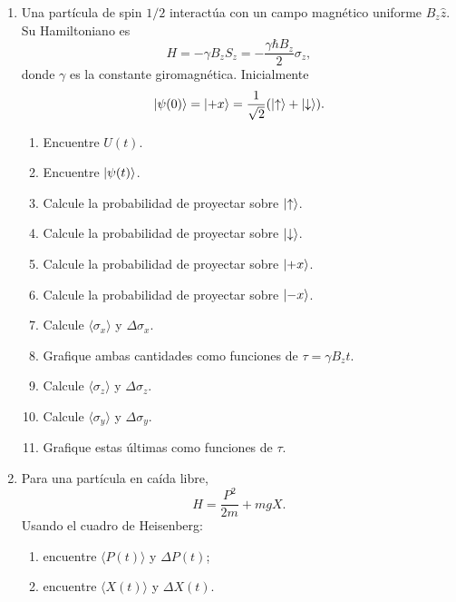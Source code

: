 \documentclass[11pt,a4paper]{article}
\numberwithin{equation}{section}
\begin{document}
\begin{enumerate}[label=\arabic*.-]
\item Una partícula de spin $1/2$ interactúa con un campo magnético uniforme $B_z\hat z$. Su Hamiltoniano es
\begin{equation}
H=-\gamma B_zS_z=-\frac{\gamma\hbar B_z}{2}\sigma_z,
\end{equation}
donde $\gamma$ es la constante giromagnética. Inicialmente
\begin{equation}
\ket{\psi(0)}=\ket{+x}=\frac{1}{\sqrt2}(\ket\uparrow+\ket\downarrow).
\end{equation}
\begin{enumerate}[label=\alph*)]
\item Encuentre $U(t)$.
\item Encuentre $\ket{\psi(t)}$.
\item Calcule la probabilidad de proyectar sobre $\ket\uparrow$.
\item Calcule la probabilidad de proyectar sobre $\ket\downarrow$.
\item Calcule la probabilidad de proyectar sobre $\ket{+x}$.
\item Calcule la probabilidad de proyectar sobre $\ket{-x}$.
\item Calcule $\langle\sigma_x\rangle$ y $\Delta\sigma_x$.
\item Grafique ambas cantidades como funciones de $\tau=\gamma B_zt$.
\item Calcule $\langle\sigma_z\rangle$ y $\Delta\sigma_z$.
\item Calcule $\langle\sigma_y\rangle$ y $\Delta\sigma_y$.
\item Grafique estas últimas como funciones de $\tau$.
\end{enumerate}
\item Para una partícula en caída libre,
\begin{equation}H=\frac{P^2}{2m}+mgX.\end{equation}
Usando el cuadro de Heisenberg:
\begin{enumerate}[label=\alph*)]
\item encuentre $\langle P(t)\rangle$ y $\Delta P(t)$;
\item encuentre $\langle X(t)\rangle$ y $\Delta X(t)$.
\end{enumerate}
\end{enumerate}
\end{document}
